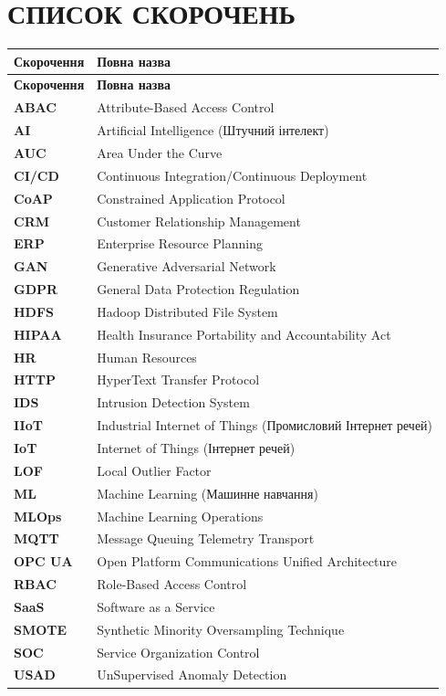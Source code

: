 \chapter*{СПИСОК СКОРОЧЕНЬ}


\begin{longtable}{|p{3cm}|p{10cm}|}
\hline
\textbf{Скорочення} & \textbf{Повна назва} \\
\hline
\endfirsthead

\hline
\textbf{Скорочення} & \textbf{Повна назва} \\
\hline
\endhead

\textbf{ABAC} & Attribute-Based Access Control \\
\hline
\textbf{AI} & Artificial Intelligence (Штучний інтелект) \\
\hline
\textbf{AUC} & Area Under the Curve \\
\hline
\textbf{CI/CD} & Continuous Integration/Continuous Deployment \\
\hline
\textbf{CoAP} & Constrained Application Protocol \\
\hline
\textbf{CRM} & Customer Relationship Management \\
\hline
\textbf{ERP} & Enterprise Resource Planning \\
\hline
\textbf{GAN} & Generative Adversarial Network \\
\hline
\textbf{GDPR} & General Data Protection Regulation \\
\hline
\textbf{HDFS} & Hadoop Distributed File System \\
\hline
\textbf{HIPAA} & Health Insurance Portability and Accountability Act \\
\hline
\textbf{HR} & Human Resources \\
\hline
\textbf{HTTP} & HyperText Transfer Protocol \\
\hline
\textbf{IDS} & Intrusion Detection System \\
\hline
\textbf{IIoT} & Industrial Internet of Things (Промисловий Інтернет речей) \\
\hline
\textbf{IoT} & Internet of Things (Інтернет речей) \\
\hline
\textbf{LOF} & Local Outlier Factor \\
\hline
\textbf{ML} & Machine Learning (Машинне навчання) \\
\hline
\textbf{MLOps} & Machine Learning Operations \\
\hline
\textbf{MQTT} & Message Queuing Telemetry Transport \\
\hline
\textbf{OPC UA} & Open Platform Communications Unified Architecture \\
\hline
\textbf{RBAC} & Role-Based Access Control \\
\hline
\textbf{SaaS} & Software as a Service \\
\hline
\textbf{SMOTE} & Synthetic Minority Oversampling Technique \\
\hline
\textbf{SOC} & Service Organization Control \\
\hline
\textbf{USAD} & UnSupervised Anomaly Detection \\
\hline
\end{longtable}